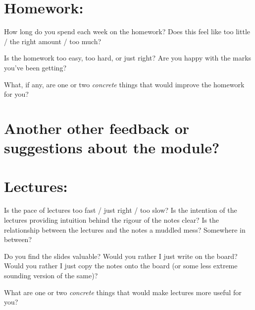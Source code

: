 \documentclass{article}
\begin{document}
\section*{Homework:}
How long do you spend each week on the homework?  Does this feel like too little / the right amount / too much?\newline

\vspace{5cm}

Is the homework too easy, too hard, or just right?  Are you happy with the marks you've been getting? \newline

\vspace{5cm}

What, if any, are one or two \emph{concrete} things that would improve the homework for you? \newline

\vspace{5cm}
\section*{Another other feedback or suggestions about the module?}

\newpage
\section*{Lectures:} 
Is the pace of lectures too fast / just right / too slow?  Is the intention of the lectures providing intuition behind the rigour of the notes clear?  Is the relationship between the lectures and the notes a muddled mess?  Somewhere in between?

\vspace{6cm}

Do you find the slides valuable?  Would you rather I just write on the board?  Would you rather I just copy the notes onto the board (or some less extreme sounding version of the same)?


\vspace{6cm}

What are one or two \emph{concrete} things that would make lectures more useful for you?
\end{document}
